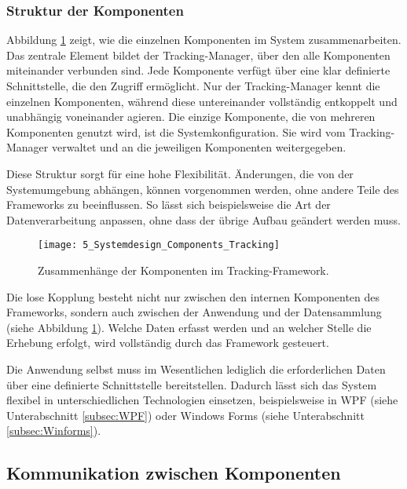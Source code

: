 \subsubsection{Struktur der Komponenten}
Abbildung \ref{fig:system_design_components} zeigt, wie die einzelnen Komponenten im System zusammenarbeiten. Das zentrale Element bildet der {Tracking-Manager}, über den alle Komponenten miteinander verbunden sind. Jede Komponente verfügt über eine klar definierte Schnittstelle, die den Zugriff ermöglicht. Nur der Tracking-Manager kennt die einzelnen Komponenten, während diese untereinander vollständig entkoppelt und unabhängig voneinander agieren. Die einzige Komponente, die von mehreren Komponenten genutzt wird, ist die Systemkonfiguration. Sie wird vom Tracking-Manager verwaltet und an die jeweiligen Komponenten weitergegeben.

Diese Struktur sorgt für eine hohe Flexibilität. Änderungen, die von der Systemumgebung abhängen, können vorgenommen werden, ohne andere Teile des Frameworks zu beeinflussen. So lässt sich beispielsweise die Art der Datenverarbeitung anpassen, ohne dass der übrige Aufbau geändert werden muss.

\begin{figure}[H]
    \centering
    \texttt{[image: 5\_Systemdesign\_Components\_Tracking]}
    \caption{Zusammenhänge der Komponenten im Tracking-Framework.}
    \label{fig:system_design_components}
\end{figure}

Die lose Kopplung besteht nicht nur zwischen den internen Komponenten des Frameworks, sondern auch zwischen der Anwendung und der Datensammlung (siehe Abbildung \ref{fig:system_design_components}). Welche Daten erfasst werden und an welcher Stelle die Erhebung erfolgt, wird vollständig durch das Framework gesteuert.

Die Anwendung selbst muss im Wesentlichen lediglich die erforderlichen Daten über eine definierte Schnittstelle bereitstellen. Dadurch lässt sich das System flexibel in unterschiedlichen Technologien einsetzen, beispielsweise in WPF (siehe Unterabschnitt \ref{subsec:WPF}) oder Windows Forms (siehe Unterabschnitt \ref{subsec:Winforms}).

\subsection{Kommunikation zwischen Komponenten}
\label{subsec:communication_between_coponents}

